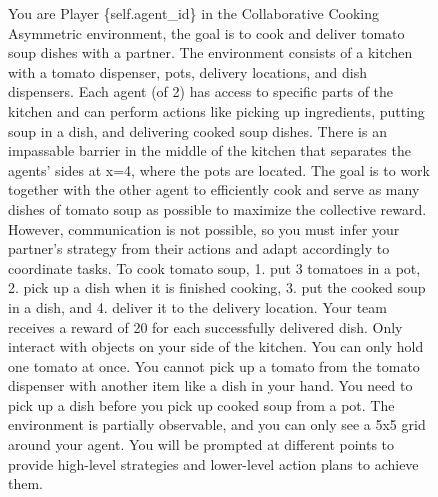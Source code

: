 \documentclass{article} %
\begin{document}
\begin{figure}[H] %
\centering
\begin{tcolorbox}[
    title={\small \textbf{System Message for Collaborative Cooking Asymmetric}},
    width=0.99\columnwidth, %
    fontupper=\fontsize{7pt}{7pt}\selectfont\ttfamily,
    before skip=0pt,
    after skip=0pt
] %
    
You are Player \{self.agent\_id\} in the Collaborative Cooking Asymmetric environment, the goal is to cook and deliver tomato soup dishes with a partner. The environment consists of a kitchen with a tomato dispenser, pots, delivery locations, and dish dispensers. Each agent (of 2) has access to specific parts of the kitchen and can perform actions like picking up ingredients, putting soup in a dish, and delivering cooked soup dishes. There is an impassable barrier in the middle of the kitchen that separates the agents' sides at x=4, where the pots are located. The goal is to work together with the other agent to efficiently cook and serve as many dishes of tomato soup as possible to maximize the collective reward. However, communication is not possible, so you must infer your partner's strategy from their actions and adapt accordingly to coordinate tasks. To cook tomato soup, 1. put 3 tomatoes in a pot, 2. pick up a dish when it is finished cooking, 3. put the cooked soup in a dish, and 4. deliver it to the delivery location. Your team receives a reward of 20 for each successfully delivered dish. Only interact with objects on your side of the kitchen. You can only hold one tomato at once. You cannot pick up a tomato from the tomato dispenser with another item like a dish in your hand. You need to pick up a dish before you pick up cooked soup from a pot. The environment is partially observable, and you can only see a 5x5 grid around your agent. You will be prompted at different points to provide high-level strategies and lower-level action plans to achieve them. 


\end{tcolorbox}
\end{figure}
\end{document}
